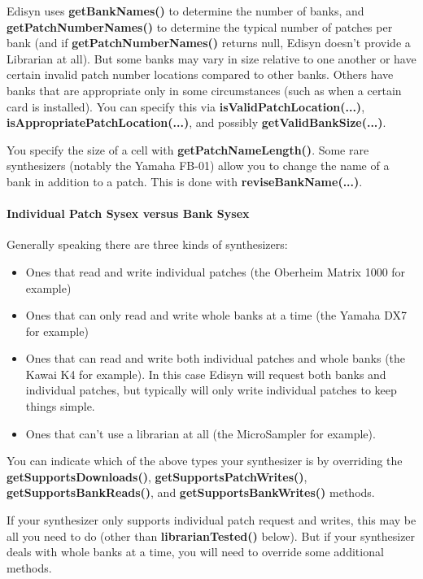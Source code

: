 \documentclass{article}
\begin{document}
Edisyn uses {\bf getBankNames()} to determine the number of banks, and {\bf getPatchNumberNames()} to determine the typical number of patches per bank (and if {\bf getPatchNumberNames()} returns null, Edisyn doesn't provide a Librarian at all).  But some banks may vary in size relative to one another or have certain invalid patch number locations compared to other banks.  Others have banks that are appropriate only in some circumstances (such as when a certain card is installed).  You can specify this via {\bf isValidPatchLocation(...)}, {\bf isAppropriatePatchLocation(...)}, and possibly {\bf getValidBankSize(...)}.

You specify the size of a cell with {\bf getPatchNameLength()}.  Some rare synthesizers (notably the Yamaha FB-01) allow you to change the name of a bank in addition to a patch.  This is done with {\bf reviseBankName(...)}.

\paragraph{Individual Patch Sysex versus Bank Sysex}  Generally speaking there are three kinds of synthesizers:

\begin{itemize}
\item Ones that read and write individual patches (the Oberheim Matrix 1000 for example)
\item Ones that can only read and write whole banks at a time (the Yamaha DX7 for example)
\item Ones that can read and write both individual patches and whole banks (the Kawai K4 for example).  In this case Edisyn will request both banks and individual patches, but typically will only write individual patches to keep things simple.  
\item Ones that can't use a librarian at all (the MicroSampler for example).
\end{itemize}

You can indicate which of the above types your synthesizer is by overriding the {\bf getSupportsDownloads()}, {\bf getSupportsPatchWrites()}, {\bf getSupportsBankReads()}, and {\bf getSupportsBankWrites()} methods.  

If your synthesizer only supports individual patch request and writes, this may be all you need to do (other than {\bf librarianTested()} below).  But if your synthesizer deals with whole banks at a time, you will need to override some additional methods.
\end{document}
